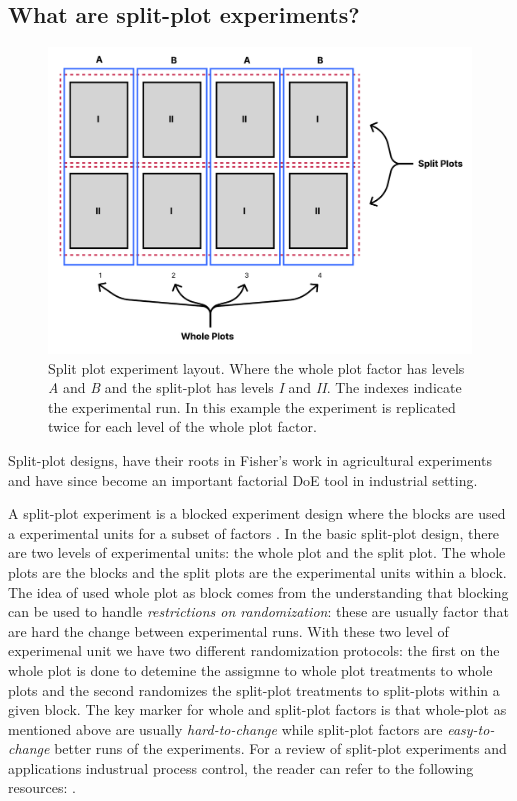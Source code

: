 \documentclass{article}
\begin{document}
\subsection{What are split-plot experiments?}
\begin{figure}
    \centering
    \includegraphics[width=0.8\linewidth]{images/splitplotdesign.png}
    \caption{Split plot experiment layout. Where the whole plot factor has levels \textit{A} and \textit{B} and the split-plot has levels \textit{I} and \textit{II}. The indexes indicate the experimental run. In this example the experiment is replicated twice for each level of the whole plot factor. }
    \label{fig:enter-label}
\end{figure}
Split-plot designs, have their roots in Fisher's work in agricultural experiments and have since become an important factorial DoE tool in industrial setting. 

A split-plot experiment is a blocked experiment design where the blocks are used a experimental units for a subset of factors \cite{Jones2009SplitPlotDW}. In the basic split-plot design, there are two levels of experimental units: the whole plot and the split plot. The whole plots are the blocks and the split plots are the experimental units within a block. The idea of used whole plot as block comes from the understanding that blocking can be used to handle \textit{restrictions on randomization}: these are usually factor that are hard the change between experimental runs. With these two level of experimenal unit we have two different randomization protocols: the first on the whole plot is done to detemine the assigmne to whole plot treatments to whole plots and the second randomizes the split-plot treatments to split-plots within a given block. The key marker for whole and split-plot factors is that whole-plot as mentioned above are usually \textit{hard-to-change} while split-plot factors are \textit{easy-to-change} better runs of the experiments. For a review of split-plot experiments and applications industrual process control, the reader can refer to the following resources: \citealp{Jones2009SplitPlotDW}. 
\end{document}
